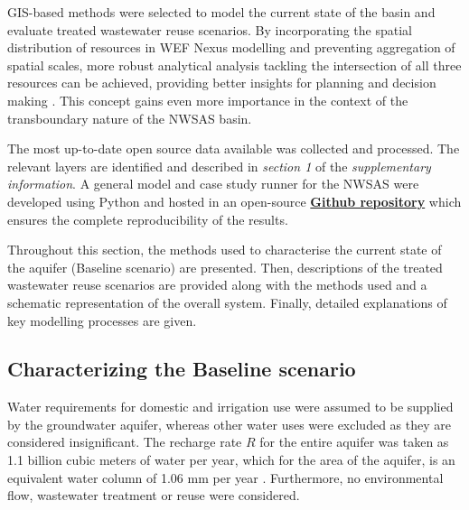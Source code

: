 GIS-based methods were selected to model the current state of the basin and evaluate treated wastewater reuse scenarios. By incorporating the spatial distribution of resources in WEF Nexus modelling and preventing aggregation of spatial scales, more robust analytical analysis tackling the intersection of all three resources can be achieved, providing better insights for planning and decision making \cite{shannakMovingTheoryPractice2018,albrechtWaterEnergyFoodNexusSystematic2018}. This concept gains even more importance in the context of the transboundary nature of the NWSAS basin.

The most up-to-date open source data available was collected and processed. The relevant layers are identified and described in \textit{section 1} of the \textit{supplementary information}. A general model and case study runner for the NWSAS were developed using Python and hosted in an open-source \href{https://github.com/camiloramirezgo/NWSAS-paper-model}{\textbf{Github repository}} which ensures the complete reproducibility of the results.

Throughout this section, the methods used to characterise the current state of the aquifer (Baseline scenario) are presented. Then, descriptions of the treated wastewater reuse scenarios are provided along with the methods used and a schematic representation of the overall system. Finally, detailed explanations of key modelling processes are given.

\subsection{Characterizing the Baseline scenario}
Water requirements for domestic and irrigation use were assumed to be supplied by the groundwater aquifer, whereas other water uses were excluded as they are considered insignificant. The recharge rate $R$ for the entire aquifer was taken as 1.1 billion cubic meters of water per year, which for the area of the aquifer, is an equivalent water column of 1.06 mm per year \cite{BetterValorizationIrrigation2015}. Furthermore, no environmental flow, wastewater treatment or reuse were considered.

